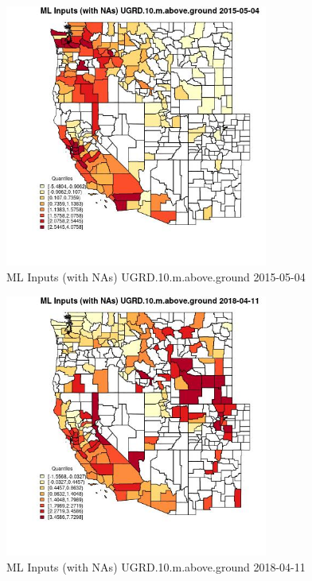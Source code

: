 \begin{figure} 
\centering  
\includegraphics[width=0.77\textwidth]{Code_Outputs/Report_ML_input_PM25_Step4_part_e_de_duplicated_aves_compiled_2019-05-18wNAs_CountyUGRD10mabovegroundMean2015-05-04_2015-05-04.jpg} 
\caption{\label{fig:Report_ML_input_PM25_Step4_part_e_de_duplicated_aves_compiled_2019-05-18wNAsCountyUGRD10mabovegroundMean2015-05-04_2015-05-04}ML Inputs (with NAs) UGRD.10.m.above.ground 2015-05-04} 
\end{figure} 
 

\clearpage 

\begin{figure} 
\centering  
\includegraphics[width=0.77\textwidth]{Code_Outputs/Report_ML_input_PM25_Step4_part_e_de_duplicated_aves_compiled_2019-05-18wNAs_CountyUGRD10mabovegroundMean2018-04-11_2018-04-11.jpg} 
\caption{\label{fig:Report_ML_input_PM25_Step4_part_e_de_duplicated_aves_compiled_2019-05-18wNAsCountyUGRD10mabovegroundMean2018-04-11_2018-04-11}ML Inputs (with NAs) UGRD.10.m.above.ground 2018-04-11} 
\end{figure} 
 

